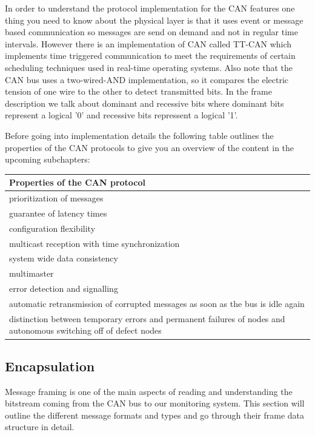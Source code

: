 In order to understand the protocol implementation for the CAN features one
thing you need to know about the physical layer is that it uses event or message
based communication so messages are send on demand and not in regular time
intervals. However there is an implementation of CAN called
TT-CAN\cite{iso11898-4} which implements time triggered communication to meet
the requirements of certain scheduling techniques used in real-time operating systems.
Also note that the CAN bus uses a two-wired-AND implementation, so it compares
the electric tension of one wire to the other to detect transmitted bits. In the
frame description we talk about dominant and recessive bits where dominant bits
represent a logical '0' and recessive bits repressent a logical '1'.

Before going into implementation details the following table outlines the
properties of the CAN protocols to give you an overview of the content in the
upcoming subchapters:

\begin{center}
    \begin{tabular}{ | p{35em} |}
    \hline
    \rowcolor{lightgray} Properties of the CAN protocol \\ \hline
    prioritization of messages \\ \hline
    guarantee of latency times \\ \hline
    configuration flexibility \\ \hline
    multicast reception with time synchronization \\ \hline
    system wide data consistency \\ \hline
    multimaster \\ \hline
    error detection and signalling \\ \hline
    automatic retransmission of corrupted messages as soon as the bus is idle
    again \\ \hline 
    distinction between temporary errors and permanent
    failures of nodes and autonomous switching off of defect nodes\\
    \hline
    \end{tabular}
\end{center}

\subsection{Encapsulation}
Message framing is one of the main aspects of reading and understanding the
bitstream coming from the CAN bus to our monitoring system. This section will
outline the different message formats and types and go through their frame data
structure in detail.
